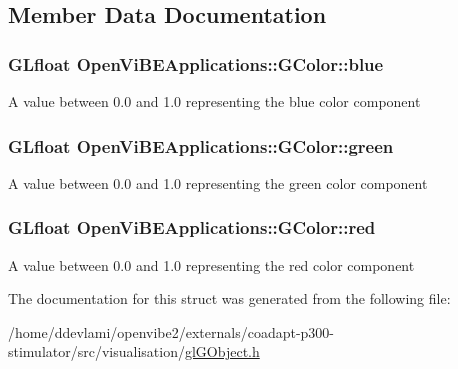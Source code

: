 \subsection{Member Data Documentation}
\hypertarget{structOpenViBEApplications_1_1GColor_a0c7f93a7f846297b0a9562ec847af43f}{
\subsubsection[{blue}]{\setlength{\rightskip}{0pt plus 5cm}GLfloat {\bf OpenViBEApplications::GColor::blue}}}
\label{structOpenViBEApplications_1_1GColor_a0c7f93a7f846297b0a9562ec847af43f}
A value between 0.0 and 1.0 representing the blue color component \hypertarget{structOpenViBEApplications_1_1GColor_a1a23576e675d0d23c46fa0eac403f895}{
\subsubsection[{green}]{\setlength{\rightskip}{0pt plus 5cm}GLfloat {\bf OpenViBEApplications::GColor::green}}}
\label{structOpenViBEApplications_1_1GColor_a1a23576e675d0d23c46fa0eac403f895}
A value between 0.0 and 1.0 representing the green color component \hypertarget{structOpenViBEApplications_1_1GColor_a5b1ea4c587174b82ab5a5d9697609a47}{
\subsubsection[{red}]{\setlength{\rightskip}{0pt plus 5cm}GLfloat {\bf OpenViBEApplications::GColor::red}}}
\label{structOpenViBEApplications_1_1GColor_a5b1ea4c587174b82ab5a5d9697609a47}
A value between 0.0 and 1.0 representing the red color component 

The documentation for this struct was generated from the following file:\begin{DoxyCompactItemize}
\item 
/home/ddevlami/openvibe2/externals/coadapt-\/p300-\/stimulator/src/visualisation/\hyperlink{glGObject_8h}{glGObject.h}\end{DoxyCompactItemize}
